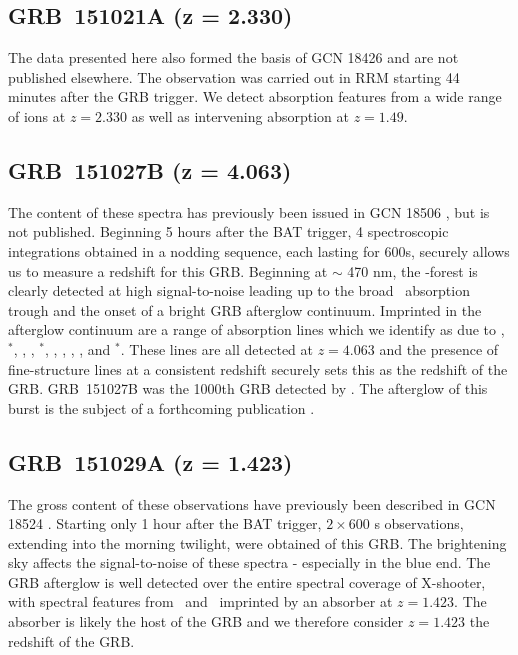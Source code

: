\documentclass[longauth]{aa}    %
\begin{document}
\subsection{GRB~151021A (z = 2.330)}\label{151021}

The data presented here also formed the basis of GCN 18426 \citep{GCN18982} and
are not published elsewhere. The observation was carried out in RRM starting 44
minutes after the GRB trigger. We detect absorption features from a wide range
of ions at $z=2.330$ as well as intervening absorption at $z=1.49$.

\subsection{GRB~151027B (z = 4.063)}\label{151027}

The content of these spectra has previously been issued in GCN 18506
\citep{GCN18506}, but is not published. Beginning 5 hours after the BAT trigger,
4 spectroscopic integrations obtained in a nodding sequence, each lasting for
600s, securely allows us to measure a redshift for this GRB. Beginning at $\sim$
470 nm, the \lya-forest is clearly detected at high signal-to-noise leading up
to the broad \lya~absorption trough and the onset of a bright GRB afterglow
continuum. Imprinted in the afterglow continuum are a range of absorption lines
which we identify as due to \SIii, \SIii$^*$, \oi, \cii, \cii$^*$, \civ, \alii,
\alii, \feii, and \feii$^*$. These lines are all detected at $z = 4.063$ and the
presence of fine-structure lines at a consistent redshift securely sets this as
the redshift of the GRB. GRB~151027B was the 1000th GRB detected by \swift. The
afterglow of this burst is the subject of a forthcoming publication
\citep{Greiner2018}.

\subsection{GRB~151029A (z = 1.423)}\label{151029}

The gross content of these observations have previously been described in GCN
18524 \citep{GCN18524}. Starting only 1 hour after the BAT trigger, $2 \times
600$ s observations, extending into the morning twilight, were obtained of this
GRB. The brightening sky affects the signal-to-noise of these spectra -
especially in the blue end. The GRB afterglow is well detected over the entire
spectral coverage of X-shooter, with spectral features from \feii~and
\mgii~imprinted by an absorber at $z = 1.423$. The absorber is likely the host
of the GRB and we therefore consider $z = 1.423$ the redshift of the GRB.
\end{document}
